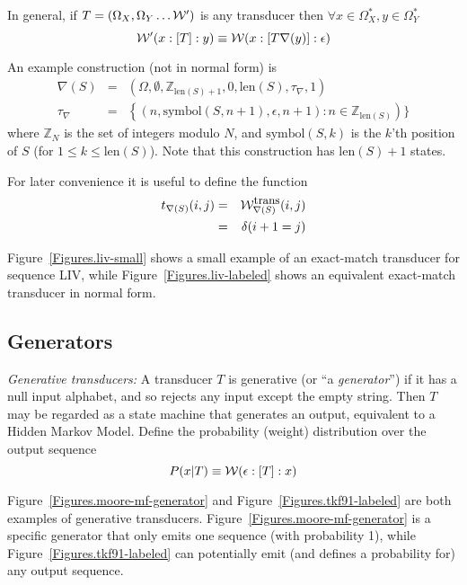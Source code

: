 \documentclass{article}
\newcommand{\seclabel}[1]{\label{sec.#1}}
\newcommand{\figref}[1]{Figure~\ref{Figures.#1}}
\newcommand\charat[2]{\mbox{symbol}(#1,#2)}
\newcommand\gappedalphabet[1]{(\Omega_{#1} \cup \{\epsilon\})}
\newcommand\gapsquared{\gappedalphabet{}^2}
\newcommand\wtrans[4]{#1(#2 : [#3] : #4)}
\newcommand\compose{}
\newcommand\recognize{\nabla}
\newcommand\Transitions{\tau}
\newcommand\transitionsof[1]{\Transitions_{#1}}
\newcommand\weight{{\cal W}}
\newcommand\weightfunof[1]{\weight_{#1}}
\newcommand\transweightfun[1]{\weightfunof{#1}^{\mbox{\small trans}}}
\newcommand\seqlen[1]{\mbox{len}(#1)}
\newcommand\profTrans[1]{t_{#1}}
\begin{document}
In general, if $T=(\Omega_X,\Omega_Y \ldots \weight')$ is any transducer then $\forall x \in \Omega_X^\ast, y \in \Omega_Y^\ast$
\[
\wtrans{\weight'}{x}{T}{y} \equiv \wtrans{\weight}{x}{T \compose \recognize(y)}{\epsilon}
\]

An example construction (not in normal form) is
\begin{eqnarray*}
\recognize(S) & = & (\Omega,\emptyset,\mathbb{Z}_{\seqlen{S}+1},0,\seqlen{S},\transitionsof{\recognize},1) \\
\transitionsof{\recognize} & = & \left\{\left(n,\charat{S}{n+1},\epsilon,n+1\right):n \in \mathbb{Z}_{\seqlen{S}}\right)\}
\end{eqnarray*}
where $\mathbb{Z}_N$ is the set of integers modulo $N$,
 and $\charat{S}{k}$ is the $k$'th position of $S$ (for $1 \leq k \leq \seqlen{S}$).
Note that this construction has $\seqlen{S}+1$ states.

For later convenience it is useful to define the function
\begin{eqnarray*}
\profTrans{\recognize(S)}(i,j) & = & \transweightfun{\recognize(S)}(i,j) \\
& = & \delta(i+1 = j)
\end{eqnarray*}

\figref{liv-small} shows a small example of an exact-match transducer for sequence LIV,
while \figref{liv-labeled} shows an equivalent exact-match transducer in normal form.




\subsection{Generators}
\seclabel{GenSinglet}
{\em Generative transducers:}
A transducer $T$ is generative (or ``a {\em generator}'') if it has a null input alphabet, and so rejects any input except the empty string.
Then $T$ may be regarded as a state machine that generates an output, equivalent to a Hidden Markov Model.
Define the probability (weight) distribution over the output sequence
\[
P(x|T) \equiv \wtrans{\weight}{\epsilon}{T}{x}
\]

\figref{moore-mf-generator} and \figref{tkf91-labeled} are both examples of generative transducers.
\figref{moore-mf-generator} is a specific generator that only emits one sequence (with probability 1),
while \figref{tkf91-labeled} can potentially emit (and defines a probability for) any output sequence.


\end{document}
